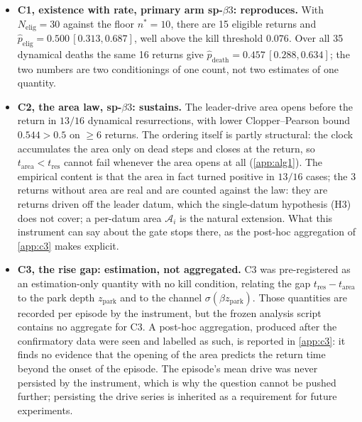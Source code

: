 \documentclass[11pt]{article}
\theoremstyle{definition}
\theoremstyle{remark}
\begin{document}
\begin{itemize}
\item \textbf{C1, existence with rate, primary arm sp-$\beta3$: reproduces.}
With $N_{\mathrm{elig}}=30$ against the floor $n^\ast=10$, there are 15 eligible
returns and $\hat p_{\mathrm{elig}}=0.500\,[0.313,0.687]$, well above the kill
threshold $0.076$. Over all 35 dynamical deaths the same 16 returns give
$\hat p_{\mathrm{death}}=0.457\,[0.288,0.634]$; the two numbers are two
conditionings of one count, not two estimates of one quantity.

\item \textbf{C2, the area law, sp-$\beta3$: sustains.} The leader-drive area
opens before the return in $13/16$ dynamical resurrections, with lower
Clopper--Pearson bound $0.544>0.5$ on $\ge6$ returns. The ordering itself is
partly structural: the clock accumulates the area only on dead steps and closes
at the return, so $t_{\mathrm{area}}<t_{\mathrm{res}}$ cannot fail whenever the
area opens at all (\cref{app:alg1}). The empirical content is that the area in
fact turned positive in $13/16$ cases; the 3 returns without area are real and
are counted against the law: they are returns driven off the
leader datum, which the single-datum hypothesis (H3) does not cover; a
per-datum area $\mathcal A_i$ is the natural extension. What this instrument can
say about the gate stops there, as the post-hoc aggregation of
\cref{app:c3} makes explicit.

\item \textbf{C3, the rise gap: estimation, not aggregated.} C3 was
pre-registered as an estimation-only quantity with no kill condition, relating
the gap $t_{\mathrm{res}}-t_{\mathrm{area}}$ to the park depth
$z_{\mathrm{park}}$ and to the channel $\sigma(\beta z_{\mathrm{park}})$. Those
quantities are recorded per episode by the instrument, but the frozen analysis
script contains no aggregate for C3. A post-hoc aggregation, produced after the
confirmatory data were seen and labelled as such, is reported in
\cref{app:c3}: it finds no evidence that the opening of the area predicts the
return time beyond the onset of the episode. The episode's mean drive was never
persisted by the instrument, which is why the question cannot be pushed
further; persisting the drive series is inherited as a requirement for future
experiments.


\end{itemize}
\end{document}
